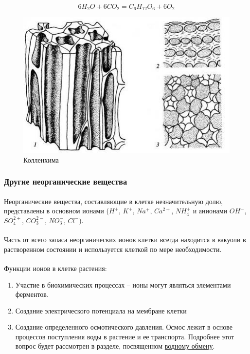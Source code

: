 \begin{equation}
	6H_{2}O + 6CO_{2} = C_{6}H_{12}O_{6} + 6O_{2}
	\label{fotosynteses_example}
\end{equation}

\begin{figure}
  \centering
       \includegraphics[width=0.5\linewidth]{pictures/collenhima}
\caption{Колленхима}
\label{collenhima}
\end{figure}

\subsubsection*{Другие неорганические вещества}

\paragraph*{}Неорганические вещества, составляющие в клетке незначительную долю, представлены в основном ионами ($H^{+}$, $K^{+}$, $Na^{+}$, $Ca^{2+}$, $NH_{4}^{+}$ и анионами $OH^{-}$, $SO_{4}^{2+}$, $CO_{3}^{2-}$, $NO_{3}^{-}$, $Cl^{-}$). 

\paragraph*{}Часть от всего запаса неорганических ионов клетки всегда находится в вакуоли в растворенном состоянии и используется клеткой по мере необходимости. 

\paragraph*{}Функции ионов в клетке растения:

\begin{enumerate}
 \item Участие в биохимических процессах -- ионы могут являться элементами ферментов. 
 \item Создание электрического потенциала на мембране клетки
 \item Создание определенного осмотического давления. Осмос лежит в основе процессов поступления воды в растение и ее транспорта. Подробнее этот вопрос будет рассмотрен в разделе, посвященном \hyperlink{whater_circulation}{водному обмену}.
\end{enumerate}

